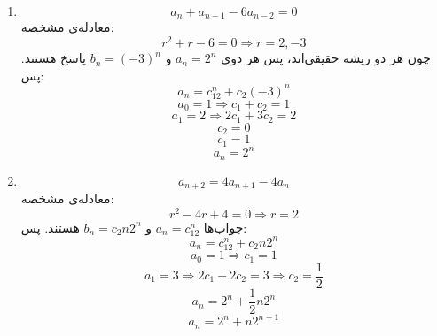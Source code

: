 \p
\begin{enumerate}
\item
$$a_n + a_{n-1} - 6a_{n-2} = 0$$
معادله‌ی مشخصه:
$$r^2 + r - 6 = 0 \Rightarrow r = 2, -3$$
چون هر دو ریشه حقیقی‌اند، پس هر دوی
$a_n = 2^n$
و
$b_n = (-3)^n$
پاسخ هستند. پس:
$$a_n = c_12^n + c_2(-3)^n$$
$$a_0 = 1 \Rightarrow c_1 + c_2 = 1$$
$$a_1 = 2 \Rightarrow 2c_1 + 3c_2 = 2$$
$$c_2 = 0$$
$$c_1 = 1$$
$$a_n = 2^n$$
\item
$$a_{n+2} = 4a_{n+1} - 4a_n$$
معادله‌ی مشخصه:
$$r^2 - 4r + 4 = 0 \Rightarrow r = 2$$
جواب‌ها
$a_n = c_12^n$
و
$b_n = c_2n2^n$
هستند. پس:
$$a_n = c_12^n + c_2n2^n$$
$$a_0 = 1 \Rightarrow c_1 = 1$$
$$a_1 = 3 \Rightarrow 2c_1 + 2c_2 = 3 \Rightarrow c_2 = \frac{1}{2}$$
$$a_n = 2^n + \frac{1}{2}n2^n$$
$$a_n = 2^n + n2^{n-1}$$
\end{enumerate}